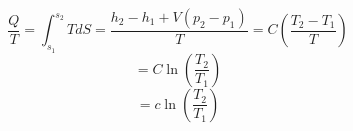 

\item[b)] 
    \begin{equation}
    \frac{Q}{T} = \int_{s_1}^{s_2} T dS = \frac{h_2 - h_1 + V(p_2 - p_1)}{T} = C \left( \frac{T_2 - T_1}{T} \right)
    \end{equation}
    \begin{equation}
    = C \ln \left( \frac{T_2}{T_1} \right)
    \end{equation}
    \begin{equation}
    = c \ln \left( \frac{T_2}{T_1} \right)
    \end{equation}